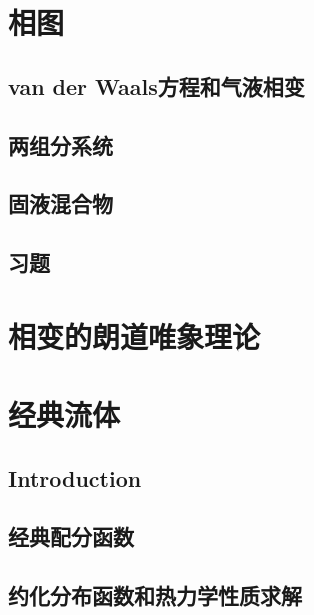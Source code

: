 \documentclass[AutoFakeBold]{tstextbook}
\begin{document}
\chapter{相图} %
\label{cha:相图}
\section{van der Waals方程和气液相变} %
\label{sec:van der Waals方程和气液相变}

\section{两组分系统} %
\label{sec:两组分系统}

\section{固液混合物} %
\label{sec:固液混合物}

\section{习题} %
\label{sec:习题12}

\chapter{相变的朗道唯象理论} %
\label{cha:相变的朗道唯象理论}


\chapter{经典流体} %
\label{cha:经典流体}
\section{Introduction} %
\label{sec:Introduction 14}

\section{经典配分函数} %
\label{sec:经典配分函数}

\section{约化分布函数和热力学性质求解} %
\label{sec:约化分布函数和热力学性质求解}
\end{document}
